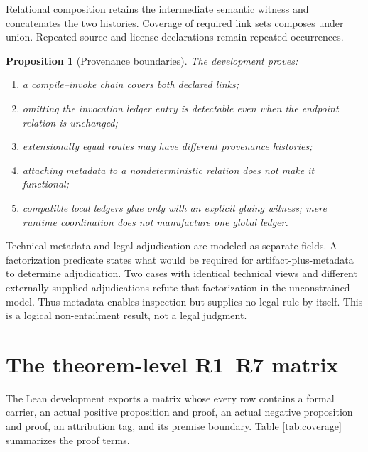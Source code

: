 \documentclass[11pt]{article}
\newtheorem{proposition}[definition]{Proposition}
\begin{document}
Relational composition retains the intermediate semantic witness and
concatenates the two histories.  Coverage of required link sets composes under
union.  Repeated source and license declarations remain repeated occurrences.

\begin{proposition}[Provenance boundaries]
The development proves:
\begin{enumerate}
  \item a compile--invoke chain covers both declared links;
  \item omitting the invocation ledger entry is detectable even when the
        endpoint relation is unchanged;
  \item extensionally equal routes may have different provenance histories;
  \item attaching metadata to a nondeterministic relation does not make it
        functional;
  \item compatible local ledgers glue only with an explicit gluing witness;
        mere runtime coordination does not manufacture one global ledger.
\end{enumerate}
\end{proposition}

Technical metadata and legal adjudication are modeled as separate fields.  A
factorization predicate states what would be required for artifact-plus-metadata
to determine adjudication.  Two cases with identical technical views and
different externally supplied adjudications refute that factorization in the
unconstrained model.  Thus metadata enables inspection but supplies no legal
rule by itself.  This is a logical non-entailment result, not a legal judgment.

\section{The theorem-level R1--R7 matrix}

The Lean development exports a matrix whose every row contains a formal
carrier, an actual positive proposition and proof, an actual negative
proposition and proof, an attribution tag, and its premise boundary.  Table
\ref{tab:coverage} summarizes the proof terms.
\end{document}
